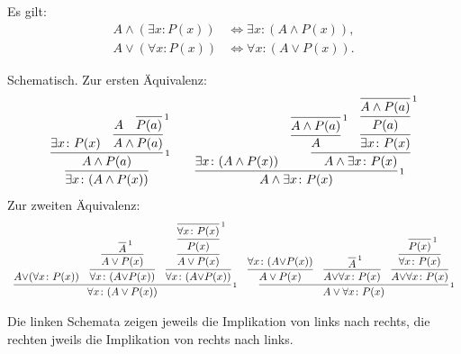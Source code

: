 \begin{Satz}%
\label{general-dl}
Es gilt:
\begin{align}
A\land (\exists x\colon P(x)) &\iff \exists x\colon (A\land P(x)),\\
A\lor (\forall x\colon P(x)) &\iff \forall x\colon (A\lor P(x)).
\end{align}
\end{Satz}
\begin{Beweis}
Schematisch. Zur ersten Äquivalenz:
\[\begin{array}{c@{\qquad}c}
\infer{\exists x\colon (A\land P(x))}{
  \infer[\infernote{1}]{A\land P(a)}{
    \exists x\colon P(x)
    & \infer{A\land P(a)}{A & \infer[\infernote{1}]{P(a)}{}}
  }
}
&
\infer[\infernote{1}]{A\land\exists x\colon P(x)}{
\exists x\colon (A\land P(x))
& \infer{A\land \exists x\colon P(x)}{
    \infer{A}{\infer[\infernote{1}]{A\land P(a)}{}}
  & \infer{\exists x\colon P(x)}{
      \infer{P(a)}{\infer[\infernote{1}]{A\land P(a)}{}}}
}
}
\end{array}\]
Zur zweiten Äquivalenz:
{\small
\[\begin{array}{c@{\quad}c}
\infer[\infernote{1}]{\forall x\colon (A\lor P(x))}{
A{\lor}(\forall x\colon P(x))
& \infer{\forall x\colon (A{\lor}P(x))}{
    \infer{A\lor P(x)}{\infer[\infernote{1}]{A}{}}
  }
& \infer{\forall x\colon (A{\lor}P(x))}{
    \infer{A\lor P(x)}{
      \infer{P(x)}{\infer[\infernote{1}]{\forall x\colon P(x)}{}}
    }
  }
}
&
\infer[\infernote{1}]{A\lor\forall x\colon P(x)}{
  \infer{A\lor P(x)}{\forall x\colon (A{\lor}P(x))}
  & \infer{A{\lor}\forall x\colon P(x)}{
      \infer[\infernote{1}]{A}{}}
  & \infer{A{\lor}\forall x\colon P(x)}{
      \infer{\forall x\colon P(x)}{
        \infer[\infernote{1}]{P(x)}{}}}
}
\end{array}\]
}

\noindent
Die linken Schemata zeigen jeweils die Implikation von links nach
rechts, die rechten jweils die Implikation von rechts nach
links.\,\qedsymbol
\end{Beweis}

